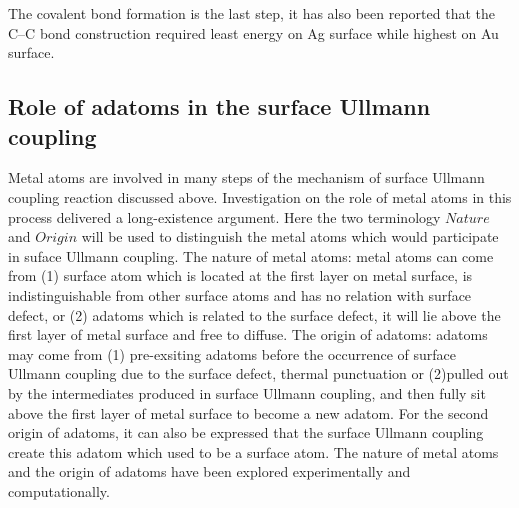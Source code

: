 \documentclass[%
 reprint,
 amsmath,amssymb,
 aps,
prb,
]{revtex4-1}
\begin{document}
The covalent bond formation is the last step, it has also been reported that the C--C bond construction required least energy on Ag surface while highest on Au surface.  

\subsection{Role of adatoms in the surface Ullmann coupling} 

Metal atoms are involved in many steps of the mechanism of surface Ullmann coupling reaction discussed above. Investigation on the role of metal atoms in this process delivered a long-existence argument.
Here the two terminology $Nature$ and $Origin$ will be used to distinguish the metal atoms which would participate in suface Ullmann coupling.
The nature of metal atoms: metal atoms can come from (1) surface atom which is located at the first layer on metal surface, is indistinguishable from other surface atoms and has no relation with surface defect, or (2) adatoms which is related to the surface defect, it will lie above the first layer of metal surface and free to diffuse.
The origin of adatoms: adatoms may come from (1) pre-exsiting adatoms before the occurrence of surface Ullmann coupling due to the surface defect, thermal punctuation or (2)pulled out by the intermediates produced in surface Ullmann coupling, and then fully sit above the first layer of metal surface to become a new adatom. For the second origin of adatoms, it can also be expressed that the surface Ullmann coupling create this adatom which used to be a surface atom. The nature of metal atoms and the origin of adatoms have been explored experimentally and computationally.
\end{document}
